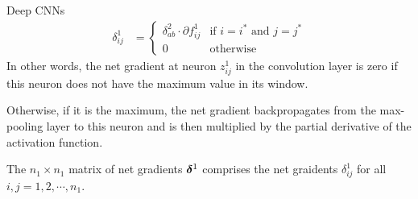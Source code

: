 \begin{frame}{Deep CNNs}
\begin{align*}
    \delta^1_{ij} & = 
    \begin{cases}
    \delta^2_{ab} \cdot \partial f^1_{ij} & \text{if $i=i^*$ and
    $j=j^*$}\\
    0 & \text{otherwise}
    \end{cases}
\end{align*}
%
%
%
In other words, the net gradient at neuron $z^1_{ij}$ in the convolution
layer is zero if this neuron does not have the maximum value 
in its window. 

\medskip

Otherwise, if it is the maximum, 
the net gradient backpropagates from the max-pooling layer to this
neuron and is then multiplied by the partial derivative of the
activation function. 


\medskip

The $n_1 \times n_1$ matrix of net
gradients ${\bm \delta}^1$ comprises the net graidents $\delta^1_{ij}$ for
all $i,j = 1,2,\cdots,n_1$.
\end{frame}
